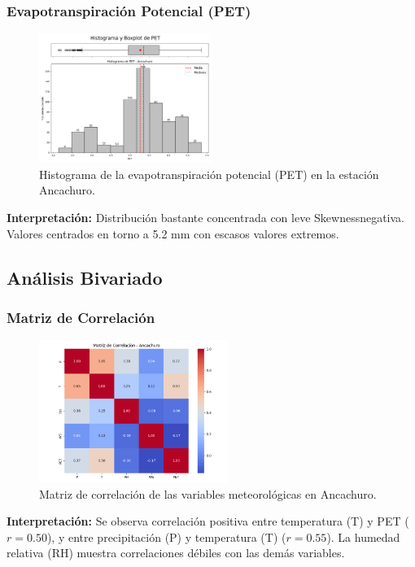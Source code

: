 \subsubsection*{Evapotranspiración Potencial (PET)}
\begin{figure}[H]
\centering
\includegraphics[width=0.5\textwidth]{resultados/por_estacion_meteorologica/Ancachuro/PET_histograma.png}
\caption{Histograma de la evapotranspiración potencial (PET) en la estación Ancachuro.}
\label{fig:ancachuro_PET}
\end{figure}
\textbf{Interpretación:} Distribución bastante concentrada con leve Skewnessnegativa. Valores centrados en torno a 5.2 mm con escasos valores extremos.

\subsection{Análisis Bivariado}

\subsubsection*{Matriz de Correlación}
\begin{figure}[H]
\centering
\includegraphics[width=0.55\textwidth]{resultados/por_estacion_meteorologica/Ancachuro/matriz_correlacion.png}
\caption{Matriz de correlación de las variables meteorológicas en Ancachuro.}
\label{fig:ancachuro_corr}
\end{figure}
\textbf{Interpretación:} Se observa correlación positiva entre temperatura (T) y PET (\(r = 0.50\)), y entre precipitación (P) y temperatura (T) (\(r = 0.55\)). La humedad relativa (RH) muestra correlaciones débiles con las demás variables.

